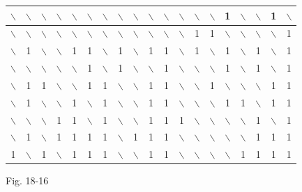 \documentclass[10pt]{article}
\begin{document}
\begin{center}
\begin{tabular}{|c|c|c|c|c|c|c|c|c|c|c|c|c|c|c|c|c|c|c|}
\hline
$\backslash$ & $\backslash$ & $\backslash$ & $\backslash$ & $\backslash$ & $\backslash$ & $\backslash$ & $\backslash$ & $\backslash$ & $\backslash$ & $\backslash$ & $\backslash$ & $\backslash$ & $\backslash$ & 1 & $\backslash$ & $\backslash$ & 1 & $\backslash$ \\
\hline
$\backslash$ & $\backslash$ & $\backslash$ & $\backslash$ & $\backslash$ & $\backslash$ & $\backslash$ & $\backslash$ & $\backslash$ & $\backslash$ & $\backslash$ & $\backslash$ & 1 & 1 & $\backslash$ & $\backslash$ & $\backslash$ & $\backslash$ & 1 \\
\hline
$\backslash$ & 1 & $\backslash$ & $\backslash$ & 1 & 1 & $\backslash$ & 1 & $\backslash$ & 1 & 1 & $\backslash$ & 1 & $\backslash$ & 1 & $\backslash$ & 1 & $\backslash$ & 1 \\
\hline
$\backslash$ & $\backslash$ & $\backslash$ & $\backslash$ & $\backslash$ & 1 & $\backslash$ & 1 & $\backslash$ & $\backslash$ & 1 & $\backslash$ & $\backslash$ & $\backslash$ & 1 & $\backslash$ & 1 & $\backslash$ & 1 \\
\hline
$\backslash$ & 1 & 1 & $\backslash$ & $\backslash$ & 1 & 1 & $\backslash$ & $\backslash$ & 1 & 1 & $\backslash$ & $\backslash$ & 1 & $\backslash$ & $\backslash$ & $\backslash$ & 1 & 1 \\
\hline
$\backslash$ & 1 & $\backslash$ & $\backslash$ & 1 & $\backslash$ & 1 & $\backslash$ & $\backslash$ & 1 & 1 & $\backslash$ & $\backslash$ & $\backslash$ & 1 & 1 & $\backslash$ & 1 & 1 \\
\hline
$\backslash$ & $\backslash$ & $\backslash$ & 1 & 1 & $\backslash$ & 1 & $\backslash$ & $\backslash$ & 1 & 1 & 1 & $\backslash$ & $\backslash$ & $\backslash$ & $\backslash$ & 1 & $\backslash$ & 1 \\
\hline
$\backslash$ & 1 & $\backslash$ & 1 & 1 & 1 & 1 & $\backslash$ & 1 & 1 & 1 & $\backslash$ & $\backslash$ & $\backslash$ & $\backslash$ & $\backslash$ & 1 & 1 & 1 \\
\hline
1 & $\backslash$ & 1 & $\backslash$ & 1 & 1 & 1 & $\backslash$ & $\backslash$ & 1 & 1 & $\backslash$ & $\backslash$ & $\backslash$ & $\backslash$ & 1 & 1 & 1 & 1 \\
\hline
\end{tabular}
\end{center}

Fig. 18-16
\end{document}
